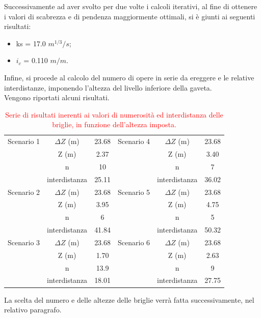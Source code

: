 Successivamente ad aver svolto per due volte i calcoli iterativi, al fine di ottenere i valori di scabrezza e di pendenza maggiormente ottimali, si è giunti ai seguenti risultati:
\begin{itemize}
    \item ks = 17.0 $m^{1/3}/s$;
    \item $i_c$ = 0.110 $m/m$.
\end{itemize}

Infine, si procede al calcolo del numero di opere in serie da ereggere e le relative interdistanze, imponendo l'altezza del livello inferiore della gaveta.\\
Vengono riportati alcuni risultati.
\begin{table}[H] \centering
    \caption{\textcolor{red}{Serie di risultati inerenti ai valori di numerosità ed interdistanza delle briglie, in funzione dell'altezza imposta.}}
    \begin{tabular}{ccc|ccc}
        \toprule
    Scenario 1 & $\Delta Z$ (m)& 23.68 & Scenario 4 & $\Delta Z$ (m) & 23.68 \\
& Z (m)         & 2.37  &            & Z (m)         & 3.40  \\
& n             & 10  &            & n             & 7  \\
& interdistanza & 25.11 &            & interdistanza & 36.02 \\
\midrule
Scenario 2 & $\Delta Z$ (m)        & 23.68 & Scenario 5 & $\Delta Z$ (m) & 23.68 \\
& Z (m)         & 3.95  &            & Z (m)         & 4.75  \\
& n             & 6   &            & n             & 5   \\
& interdistanza & 41.84 &            & interdistanza & 50.32 \\
    \midrule
Scenario 3 & $\Delta Z$ (m)        & 23.68 & Scenario 6 & $\Delta Z$ (m)        & 23.68 \\
& Z (m)         & 1.70  &            & Z (m)         & 2.63  \\
& n             & 13.9  &            & n             & 9  \\
& interdistanza & 18.01 &            & interdistanza & 27.75 \\
\bottomrule
\end{tabular}
\label{opzioni_numero_altezza_briglie}
\end{table}
La scelta del numero e delle altezze delle briglie verrà fatta successivamente, nel relativo paragrafo.

